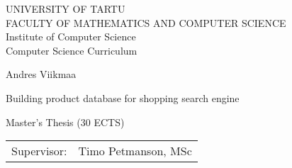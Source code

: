 \documentclass[12pt]{article}
\begin{document}
\thispagestyle{empty}
\begin{center}

\large
UNIVERSITY OF TARTU\\[2mm]
\uppercase{Faculty of Mathematics and Computer Science}\\[2mm]
Institute of Computer Science\\
Computer Science Curriculum\\[2mm]

\vspace{25mm}

\Large Andres Viikmaa

\vspace{4mm}

\huge Building product database for shopping search engine

\vspace{20mm}

\Large Master's Thesis (30 ECTS)

\end{center}

\vspace{2mm}

\begin{flushright}
 {
 \setlength{\extrarowheight}{5pt}
 \begin{tabular}{r l} 
  \sffamily Supervisor: & \sffamily  Timo Petmanson, MSc
 \end{tabular}
 }
\end{flushright}

\vspace{10mm}

\vspace{2mm}



\vspace{2mm}


\vspace{8mm}
\end{document}
